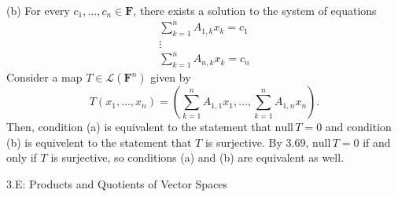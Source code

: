\documentclass{book}
\begin{document}
\begin{enumerate}
(b) For every \(c_1,\dots,c_n \in \textbf{F}\), there exists a solution to the system of equations
\begin{equation*}
\begin{aligned}
\sum_{k=1}^n A_{1,k}x_k=c_1 \\
\vdots \\
\sum_{k=1}^n A_{n,k}x_k=c_n
\end{aligned}
\end{equation*}
Consider a map \(T \in \mathcal{L}(\textbf{F}^n)\) given by \[T(x_1,\dots,x_n)=(\sum_{k=1}^n A_{1,1}x_1,\dots,\sum_{k=1}^n A_{1,n}x_n).\] Then, condition (a) is equivalent to the statement that \(\textrm{null} \, T = 0\) and condition (b) is equivelent to the statement that \(T\) is surjective.  By 3.69, \(\textrm{null} \, T = 0\) if and only if \(T\) is surjective, so conditions (a) and (b) are equivalent as well.

\end{enumerate}

3.E: Products and Quotients of Vector Spaces
\end{document}
